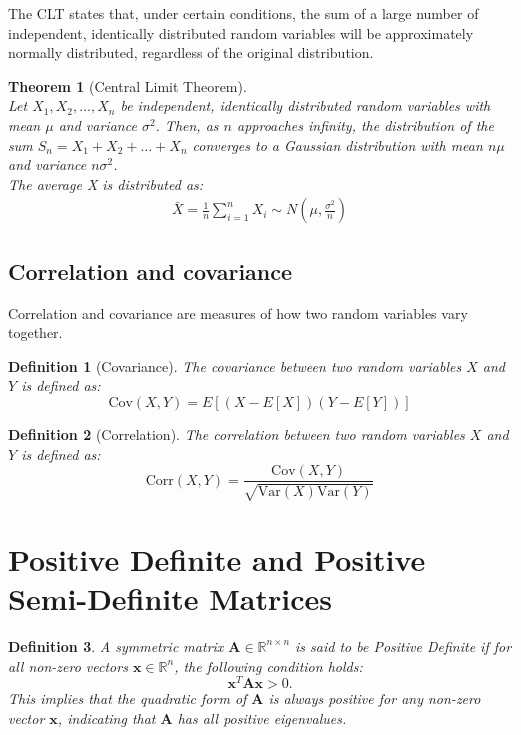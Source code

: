 \documentclass[11pt]{book} %
\newtheorem{theorem}{Theorem}[section]
\newtheorem{definition}{Definition}[section]
\begin{document}
The CLT states that, under certain conditions, the sum of a large number of independent, identically distributed random variables will be approximately normally distributed, 
regardless of the original distribution.
\begin{theorem}[Central Limit Theorem]\ \\
    Let \(X_1, X_2, \ldots, X_n\) be independent, identically distributed random variables with mean \(\mu\) and variance \(\sigma^2\). 
    Then, as \(n\) approaches infinity, the distribution of the sum \(S_n = X_1 + X_2 + \ldots + X_n\) converges to a 
    Gaussian distribution with mean \(n\mu\) and variance \(n\sigma^2\). \\
    The average X is distributed as:
    \begin{align*}
        \bar{X} = \frac{1}{n} \sum_{i=1}^{n} X_i \sim N(\mu, \frac{\sigma^2}{n})
    \end{align*}
\end{theorem}

\subsection{Correlation and covariance}

Correlation and covariance are measures of how two random variables vary together. 
\begin{definition}[Covariance]
    The covariance between two random variables \(X\) and \(Y\) is defined as:
    \begin{equation}
        \text{Cov}(X, Y) = E[(X - E[X])(Y - E[Y])]
    \end{equation}
\end{definition}

\begin{definition}[Correlation]
    The correlation between two random variables \(X\) and \(Y\) is defined as:
    \begin{equation}
        \text{Corr}(X, Y) = \frac{\text{Cov}(X, Y)}{\sqrt{\text{Var}(X) \text{Var}(Y)}}
    \end{equation}
\end{definition}



\section{Positive Definite and Positive Semi-Definite Matrices}


\begin{definition}
A symmetric matrix \(\mathbf{A} \in \mathbb{R}^{n \times n}\) is said to be \textit{Positive Definite} if for all non-zero vectors \(\mathbf{x} \in \mathbb{R}^n\), the following condition holds:
\begin{equation}
\mathbf{x}^T \mathbf{A} \mathbf{x} > 0.
\end{equation}
This implies that the quadratic form of \(\mathbf{A}\) is always positive for any non-zero vector \(\mathbf{x}\), indicating that \(\mathbf{A}\) has all positive eigenvalues.
\end{definition}
\end{document}
